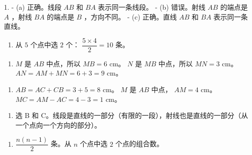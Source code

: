 \begin{answer}


1.
   - (a) 正确。线段 $AB$ 和 $BA$ 表示同一条线段。
   - (b) 错误。射线 $AB$ 的端点是 $A$ ，射线 $BA$ 的端点是 $B$ ，方向不同。
   - (c) 正确。直线 $AB$ 和 $BA$ 表示同一条直线。

\begin{enumerate}
  \item 从 $5$ 个点中选 $2$ 个： $\dfrac{5 \times 4}{2} = 10$ 条。
\end{enumerate}


\begin{enumerate}
  \item $M$ 是 $AB$ 中点，所以 $MB = 6$ cm。 $N$ 是 $MB$ 中点，所以 $MN = 3$ cm。 $AN = AM + MN = 6 + 3 = 9$ cm。
\end{enumerate}


\begin{enumerate}
  \item $AB = AC + CB = 3 + 5 = 8$ cm。 $M$ 是 $AB$ 中点， $AM = 4$ cm。 $MC = AM - AC = 4 - 3 = 1$ cm。
\end{enumerate}


\begin{enumerate}
  \item 选 B 和 C。线段是直线的一部分（有限的一段），射线也是直线的一部分（从一个点向一个方向的部分）。
\end{enumerate}


\begin{enumerate}
  \item $\dfrac{n(n-1)}{2}$ 条。从 $n$ 个点中选 $2$ 个点的组合数。
\end{enumerate}


\end{answer}
